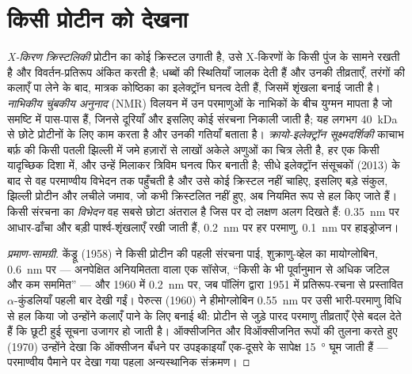 \section{किसी प्रोटीन को देखना}

\begin{definition}[संरचनात्मक विधियाँ]\label{def:b3:structural-biology:methods}
\emph{X-किरण क्रिस्टलिकी} प्रोटीन का कोई क्रिस्टल उगाती है, उसे
X-किरणों के किसी पुंज के सामने रखती है और विवर्तन-प्रतिरूप अंकित करती
है; धब्बों की स्थितियाँ जालक देती हैं और उनकी तीव्रताएँ, तरंगों की
कलाएँ पा लेने के बाद, मात्रक कोष्ठिका का इलेक्ट्रॉन घनत्व देती हैं,
जिसमें शृंखला बनाई जाती है। \emph{नाभिकीय चुंबकीय
अनुनाद} (NMR) विलयन में उन परमाणुओं के नाभिकों के बीच युग्मन मापता है
जो समष्टि में पास-पास हैं, जिनसे दूरियाँ और इसलिए कोई संरचना निकाली
जाती है; यह लगभग \qty{40}{kDa} से छोटे प्रोटीनों के लिए काम करता है
और उनकी गतियाँ बताता है। \emph{क्रायो-इलेक्ट्रॉन सूक्ष्मदर्शिकी}
काचाभ बर्फ़ की किसी पतली झिल्ली में जमे हज़ारों से लाखों अकेले अणुओं
का चित्र लेती है, हर एक किसी यादृच्छिक दिशा में, और उन्हें मिलाकर
त्रिविम घनत्व फिर बनाती है; सीधे इलेक्ट्रॉन संसूचकों (2013) के बाद से
वह परमाण्वीय विभेदन तक पहुँचती है और उसे कोई क्रिस्टल नहीं चाहिए,
इसलिए बड़े संकुल, झिल्ली प्रोटीन और लचीले जमाव, जो कभी क्रिस्टलित नहीं
हुए, अब नियमित रूप से हल किए जाते हैं। किसी संरचना का \emph{विभेदन} वह
सबसे छोटा अंतराल है जिस पर दो लक्षण अलग दिखते हैं:
\qty{0.35}{nm} पर आधार-ढाँचा और बड़ी पार्श्व-शृंखलाएँ रखी जाती हैं,
\qty{0.2}{nm} पर हर परमाणु, \qty{0.1}{nm} पर हाइड्रोजन।
\end{definition}

\begin{proof}[प्रमाण-सामग्री]
केंड्रू (1958) ने किसी प्रोटीन की पहली संरचना पाई, शुक्राणु-व्हेल का
मायोग्लोबिन, \qty{0.6}{nm} पर --- अनपेक्षित अनियमितता वाला एक
सॉसेज, ``किसी के भी पूर्वानुमान से अधिक जटिल और कम सममित''
--- और 1960 में \qty{0.2}{nm} पर, जब पॉलिंग द्वारा 1951 में
प्रतिरूप-रचना से प्रस्तावित $\alpha$-कुंडलियाँ पहली बार देखी गईं।
पेरुत्स (1960) ने हीमोग्लोबिन \qty{0.55}{nm} पर उसी भारी-परमाणु विधि
से हल किया जो उन्होंने कलाएँ पाने के लिए बनाई थी: प्रोटीन से जुड़े
पारद परमाणु तीव्रताएँ ऐसे बदल देते हैं कि छूटी हुई सूचना उजागर हो जाती
है। ऑक्सीजनित और विऑक्सीजनित रूपों की तुलना करते हुए (1970) उन्होंने
देखा कि ऑक्सीजन बँधने पर उपइकाइयाँ एक-दूसरे के सापेक्ष
\qty{15}{\degree} घूम जाती हैं --- परमाण्वीय पैमाने पर देखा गया पहला
अन्यस्थानिक संक्रमण।
\end{proof}

